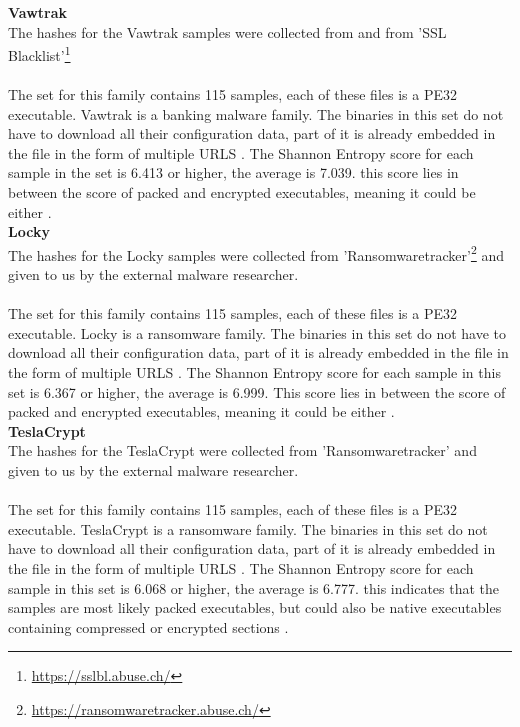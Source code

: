 \documentclass[conference]{IEEEtran}
\begin{document}
\textbf{Vawtrak}\\
The hashes for the Vawtrak samples were collected from \cite{sahin-vawtrak} and from 'SSL Blacklist'\footnote{\url{https://sslbl.abuse.ch/}}
\\\\The set for this family contains 115 samples, each of these files is a PE32 executable. Vawtrak is a banking malware family. The binaries in this set do not have to download all their configuration data, part of it is already embedded in the file in the form of  multiple URLS \cite{kroustek-vawtrak}. The Shannon Entropy score for each sample in the set is 6.413 or higher, the average is 7.039. this score lies in between the score of packed and encrypted executables, meaning it could be either \cite{hamrock-entropy}.\\


\textbf{Locky}\\
The hashes for the Locky samples were collected from 'Ransomwaretracker'\footnote{\url{https://ransomwaretracker.abuse.ch/}}  and given to us by the external malware researcher.\\\\The set for this family contains 115 samples, each of these files is a PE32 executable. Locky is a ransomware family. The binaries in this set do not have to download all their configuration data, part of it is already embedded in the file in the form of  multiple URLS \cite{nelson-locky}. The Shannon Entropy score for each sample in this set is 6.367 or higher, the average is 6.999. This score lies in between the score of packed and encrypted executables, meaning it could be either \cite{hamrock-entropy}.\\

\textbf{TeslaCrypt}\\
The hashes for the TeslaCrypt were collected from 'Ransomwaretracker' and given to us by the external malware researcher. \\\\The set for this family contains 115 samples, each of these files is a PE32 executable. TeslaCrypt is a ransomware family. The binaries in this set do not have to download all their configuration data, part of it is already embedded in the file in the form of  multiple URLS \cite{wyke-currans}. The Shannon Entropy score for each sample in this set is 6.068 or higher, the average is 6.777. this indicates that the samples are most likely packed executables, but could also be native executables containing compressed or encrypted sections \cite{hamrock-entropy}.
\end{document}

